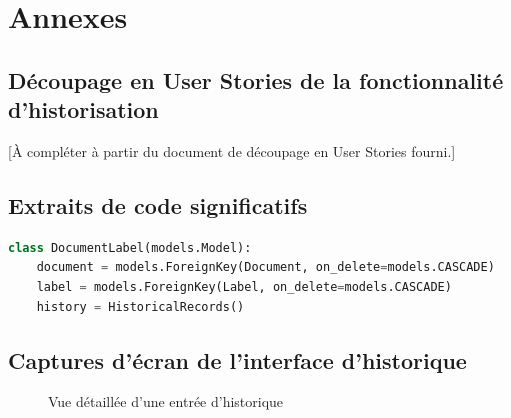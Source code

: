 
\chapter{Annexes}

\section{Découpage en User Stories de la fonctionnalité d'historisation}
\label{annexe:us}

[À compléter à partir du document de découpage en User Stories fourni.]

\section{Extraits de code significatifs}


\begin{lstlisting}[language=Python, caption={Exemple : modèle intermédiaire pour l'historisation M2M}]
class DocumentLabel(models.Model):
    document = models.ForeignKey(Document, on_delete=models.CASCADE)
    label = models.ForeignKey(Label, on_delete=models.CASCADE)
    history = HistoricalRecords()
\end{lstlisting}

\section{Captures d'écran de l'interface d'historique}

\begin{figure}[H]
  \centering
  \caption{Vue détaillée d'une entrée d'historique}
\end{figure}
